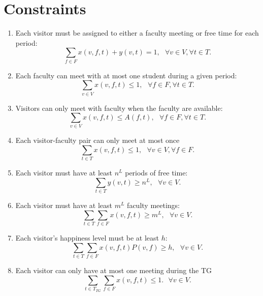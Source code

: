 \documentclass[12pt]{article}
\theoremstyle{definition}
\newtheorem{definition set}{Definition Set}%
\newtheorem{problem statement}{Problem Statement} %
\theoremstyle{remark}
\theoremstyle{remark}
\begin{document}
\section{Constraints}
\begin{enumerate}
\item
Each visitor must be assigned to either a faculty meeting or free time for each period:
\begin{equation}
\sum_{f \in F} x(v,f,t) + y(v,t) = 1, \ \ \ \forall v \in V, \forall t \in T.
\end{equation}

\item
Each faculty can meet with at most one student during a given period:
\begin{equation}
\sum_{v \in V} x(v,f,t) \leq 1, \ \ \ \forall f \in F, \forall t \in T.
\end{equation}

\item
Visitors can only meet with faculty when the faculty are available:
\begin{equation}
\sum_{v \in V} x(v,f,t) \leq A(f,t), \ \ \ \forall f \in F, \forall t \in T.
\end{equation}

\item
Each visitor-faculty pair can only meet at most once
\begin{equation}
\sum_{t \in T} x(v,f,t) \leq 1, \ \ \ \forall v \in V, \forall f \in F.
\end{equation}

\item Each visitor must have at least $n^L$ periods of free time:
\begin{equation}
\sum_{t \in T} y(v,t) \geq n^L, \ \ \ \forall v \in V.
\end{equation}

\item Each visitor must have at least $m^L$ faculty meetings:
\begin{equation}
\sum_{t \in T} \sum_{f \in F} x(v,f,t) \geq m^L, \ \ \ \forall v \in V.
\end{equation}

\item 
Each visitor\rq{}s happiness level must be at least $h$:
\begin{equation}
\sum_{t \in T} \sum_{f \in F} x(v,f,t) P(v,f) \geq h, \ \ \ \forall v \in V.
\end{equation}

\item 
Each visitor can only have at most one meeting during the TG
\begin{equation}
\sum_{t \in T_{TG}} \sum_{f \in F} x(v,f,t) \leq 1. \ \ \ \forall v \in V.
\end{equation}
\end{enumerate}
\end{document}
